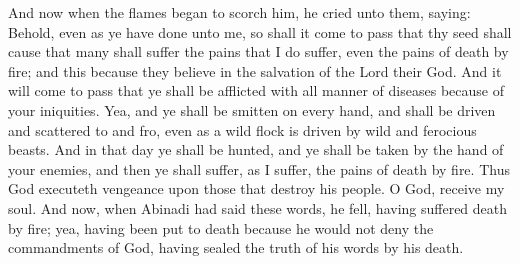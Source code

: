 And now when the flames began to scorch him, he cried unto them, saying:
\bverse \iffalse Behold, even as ye have done unto me, so shall it come to pass that thy seed shall cause that many shall suffer the pains that I do suffer, even the pains of death by fire; and this because they believe in the salvation of the Lord their God. \fi
Behold, even as ye have done unto me, so shall it come to pass that thy seed shall cause that many shall suffer the pains that I do suffer, even the pains of death by fire; and this because they believe in the salvation of the Lord their God.
\bverse \iffalse And it will come to pass that ye shall be afflicted with all manner of diseases because of your iniquities. \fi
And it will come to pass that ye shall be afflicted with all manner of diseases because of your iniquities.
\bverse \iffalse Yea, and ye shall be smitten on every hand, and shall be driven and scattered to and fro, even as a wild flock is driven by wild and ferocious beasts. \fi
Yea, and ye shall be smitten on every hand, and shall be driven and scattered to and fro, even as a wild flock is driven by wild and ferocious beasts.
\bverse \iffalse And in that day ye shall be hunted, and ye shall be taken by the hand of your enemies, and then ye shall suffer, as I suffer, the pains of death by fire. \fi
And in that day ye shall be hunted, and ye shall be taken by the hand of your enemies, and then ye shall suffer, as I suffer, the pains of death by fire.
\bverse \iffalse Thus God executeth vengeance upon those that destroy his people. O God, receive my soul. \fi
Thus God executeth vengeance upon those that destroy his people. O God, receive my soul.
\bverse \iffalse And now, when Abinadi had said these words, he fell, having suffered death by fire; yea, having been put to death because he would not deny the commandments of God, having sealed the truth of his words by his death. \fi
And now, when Abinadi had said these words, he fell, having suffered death by fire; yea, having been put to death because he would not deny the commandments of God, having sealed the truth of his words by his death.


